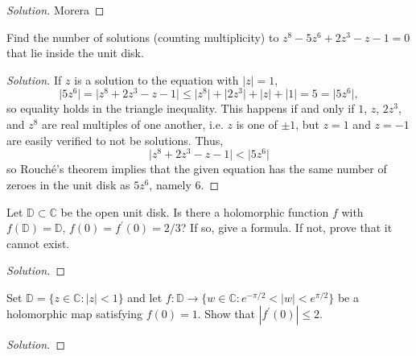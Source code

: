 \documentclass[10pt]{article}
\newenvironment{soln}{\begin{proof}[Solution]}{\end{proof}}
\providecommand{\abs}[1]{\left\lvert #1\right\rvert}
\providecommand{\smabs}[1]{\lvert #1\rvert}
\begin{document}
\begin{soln}
    Morera
\end{soln}



\begin{problem}
[2023 A-II-6]
Find the number of solutions (counting multiplicity) to $z^8-5 z^6+2 z^3-z-1=0$ that lie inside the unit disk.
\end{problem}

\begin{soln}
    If $z$ is a solution to the equation with $\abs z = 1$,
    \begin{equation*}
	\smabs{5z^6} = \smabs{z^8 + 2z^3 - z - 1}
	\le \smabs{z^8} + \smabs{2z^3} + \smabs{z} + \smabs{1}
	= 5 = \smabs{5z^6},
    \end{equation*}
    so equality holds in the triangle inequality.
    This happens if and only if $1$, $z$, $2z^3$, and $z^8$
    are real multiples of one another,
    i.e. $z$ is one of $\pm 1$, but $z = 1$
    and $z = -1$ are easily verified to not be solutions.
    Thus,
    \begin{equation*}
	\smabs{z^8 + 2z^3 - z - 1} < \smabs{5z^6}
    \end{equation*}
    so Rouch\'e's theorem implies that
    the given equation has the same number of zeroes in
    the unit disk as $5z^6$, namely $\boxed 6$.
\end{soln}



\begin{problem}
[2023 A-I-6]
Let $\mathbb{D} \subset \mathbb{C}$ be the open unit disk. Is there a holomorphic function $f$ with $f(\mathbb{D})=\mathbb{D}$, $f(0)=f^{\prime}(0)=2 / 3$? If so, give a formula. If not, prove that it cannot exist.
\end{problem}

\begin{soln}

\end{soln}



\begin{problem}
[2023 J-I-2]
Set $\mathbb{D}=\{z \in \mathbb{C} :  \smabs z<1\}$ and let $f: \mathbb{D} \to \{w \in \mathbb{C} : e^{-\pi / 2}<|w|< e^{\pi / 2}\}$ be a holomorphic map satisfying $f(0)=1$. Show that $\left|f^{\prime}(0)\right| \leq 2$.
\end{problem}

\begin{soln}

\end{soln}
\end{document}

